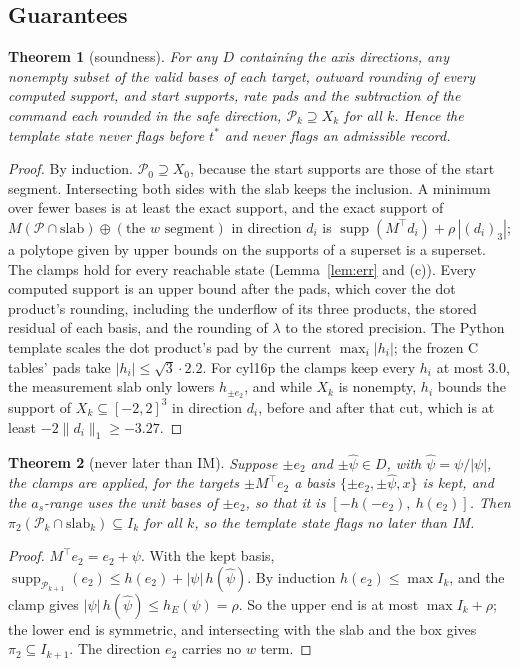 \documentclass[11pt,a4paper]{article}
\newtheorem{theorem}{Theorem}
\newcommand{\tstar}{t^{\ast}}
\begin{document}
\subsection{Guarantees}

\begin{theorem}[soundness]\label{thm:sound}
For any $D$ containing the axis directions, any nonempty subset of the valid bases of each target, outward
rounding of every computed support, and start supports, rate pads and the subtraction of the command each rounded in
the safe direction, $\mathcal{P}_k\supseteq X_k$ for all $k$. Hence the template state never flags before $\tstar$ and
never flags an admissible record.
\end{theorem}
\begin{proof}
By induction. $\mathcal{P}_0\supseteq X_0$, because the start supports are those of the start segment. Intersecting
both sides with the slab keeps the inclusion. A minimum over fewer bases is at least the exact support, and the exact
support of $M(\mathcal{P}\cap\text{slab})\oplus(\text{the $w$ segment})$ in direction $d_i$ is
$\operatorname{supp}(M^\top d_i)+\rho\,|(d_i)_3|$; a polytope given by upper bounds on the supports of a superset is a
superset. The clamps hold for every reachable state (Lemma~\ref{lem:err} and (c)). Every computed support is an upper
bound after the pads, which cover the dot product's rounding, including the underflow of its three products, the
stored residual of each basis, and the rounding of $\lambda$ to the stored precision. The Python template scales the
dot product's pad by the current $\max_i|h_i|$; the frozen C tables' pads take $|h_i|\le\sqrt3\cdot2.2$. For cyl16p
the clamps keep every $h_i$ at most 3.0, the measurement slab only lowers $h_{\pm e_2}$, and while $X_k$ is nonempty,
$h_i$ bounds the support of $X_k\subseteq[-2,2]^3$ in direction $d_i$, before and after that cut, which is at least
$-2\|d_i\|_1\ge-3.27$.
\end{proof}

\begin{theorem}[never later than IM]\label{thm:dom}
Suppose $\pm e_2$ and $\pm\hat\psi\in D$, with $\hat\psi = \psi/|\psi|$, the clamps are applied, for the targets
$\pm M^\top e_2$ a basis $\{\pm e_2, \pm\hat\psi, x\}$ is kept, and the $a_s$-range uses the unit bases of $\pm e_2$, so
that it is $[-h(-e_2),\ h(e_2)]$. Then $\pi_2(\mathcal{P}_k\cap\text{slab}_k)\subseteq I_k$
for all $k$, so the template state flags no later than IM.
\end{theorem}
\begin{proof}
$M^\top e_2 = e_2 + \psi$. With the kept basis, $\operatorname{supp}_{\mathcal{P}_{k+1}}(e_2)\le h(e_2) + |\psi|\,h(\hat\psi)$.
By induction $h(e_2)\le\max I_k$, and the clamp gives $|\psi|\,h(\hat\psi)\le h_E(\psi) = \rho$. So the upper end is at most
$\max I_k + \rho$; the lower end is symmetric, and intersecting with the slab and the box gives
$\pi_2\subseteq I_{k+1}$. The direction $e_2$ carries no $w$ term.
\end{proof}
\end{document}
